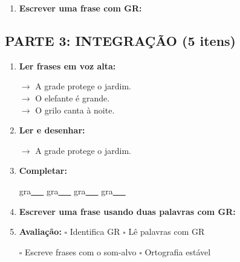 \begin{exercicio}
\begin{enumerate}[resume]
  \item \textbf{Escrever uma frase com GR:}
  \begin{center}
  \underline{\hspace{12cm}}
  \end{center}

\end{enumerate}

\subsection*{PARTE 3: INTEGRAÇÃO (5 itens)}

\begin{enumerate}[resume]

  \item \textbf{Ler frases em voz alta:}
  \begin{center}
  $\rightarrow$ A grade protege o jardim.\\
  $\rightarrow$ O elefante é grande.\\
  $\rightarrow$ O grilo canta à noite.\\
  \end{center}

  \item \textbf{Ler e desenhar:}
  \begin{center}
  $\rightarrow$ A grade protege o jardim.
  \end{center}
  \begin{center}
  \end{center}

  \item \textbf{Completar:}
  \begin{center}
  gra\underline{~~~} \quad gra\underline{~~~} \quad gra\underline{~~~} \quad gra\underline{~~~}
  \end{center}

  \item \textbf{Escrever uma frase usando duas palavras com GR:}
  \begin{center}
  \underline{\hspace{12cm}}
  \end{center}

  \item \textbf{Avaliação:} $\square$ Identifica GR \quad $\square$ Lê palavras com GR
  \begin{center}
  $\square$ Escreve frases com o som-alvo \quad $\square$ Ortografia estável
  \end{center}


\end{enumerate}
\end{exercicio}
